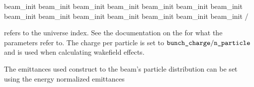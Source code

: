 {{{{{{{{{\begin{example}
    beam_init%
    beam_init%
    beam_init%
    beam_init%
    beam_init%
    beam_init%
    beam_init%
    beam_init%
    beam_init%
    beam_init%
    beam_init%
    beam_init%
    beam_init%
    beam_init%
  /
\end{example}
 refers to the universe index.
See the \bmad documentation on the  for what
the  parameters refer to. The charge per particle is set to
$\vn{bunch_charge} / \vn{n_particle}$ and is used when calculating wakefield
effects.

The emittances used construct to the beam's particle distribution can
be set using the energy normalized emittances \vn{%
\vn{%
\vn{%
are used. These emittances are also used as the initial emittance in a
linear lattice for the emittance calculation using the radiation
integrals.

}}}}}}}}}}}}
